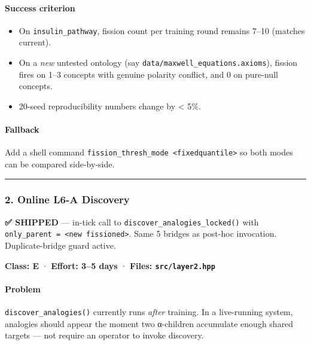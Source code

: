 \documentclass[
  11pt,
  a4paper,
]{article}
\providecommand{\tightlist}{%
  \setlength{\itemsep}{0pt}\setlength{\parskip}{0pt}}
\begin{document}
\paragraph{Success criterion}\label{success-criterion}

\begin{itemize}
\tightlist
\item
  On \texttt{insulin\_pathway}, fission count per training round remains
  7--10 (matches current).
\item
  On a \emph{new} untested ontology (say
  \texttt{data/maxwell\_equations.axioms}), fission fires on 1--3
  concepts with genuine polarity conflict, and 0 on pure-null concepts.
\item
  20-seed reproducibility numbers change by \textless{} 5\%.
\end{itemize}

\paragraph{Fallback}\label{fallback}

Add a shell command
\texttt{fission\_thresh\_mode\ \textless{}fixed\textbar{}quantile\textgreater{}}
so both modes can be compared side-by-side.

\begin{center}\rule{0.5\linewidth}{0.5pt}\end{center}

\subsubsection{2. Online L6-A Discovery}\label{online-l6-a-discovery-1}

\textbf{✅ SHIPPED} --- in-tick call to
\texttt{discover\_analogies\_locked()} with
\texttt{only\_parent\ =\ \textless{}new\ fissioned\textgreater{}}. Same
5 bridges as post-hoc invocation. Duplicate-bridge guard active.

\textbf{Class: E} · \textbf{Effort: 3--5 days} · \textbf{Files:
\texttt{src/layer2.hpp}}

\paragraph{Problem}\label{problem-1}

\texttt{discover\_analogies()} currently runs \emph{after} training. In
a live-running system, analogies should appear the moment two α-children
accumulate enough shared targets --- not require an operator to invoke
discovery.
\end{document}
